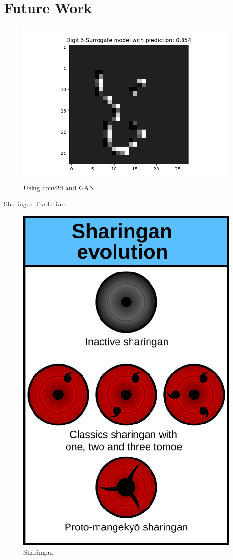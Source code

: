 \documentclass[12pt]{article}
\begin{document}
\section{Future Work}


\begin{figure}[H]
    \centering
    \includegraphics[width=0.7\linewidth]{../fig/ID 3-Digit 8 pred 5.png} %
    \caption{Using conv2d and GAN}
    \label{fig:digit5}
\end{figure}


Sharingan Evolution:\\

\begin{figure}[H]
    \centering
    \includegraphics[width=0.7\linewidth]{../fig/Sharingan-evo.png} %
    \caption{Sharingan}
    \label{fig:sharingan}
\end{figure}
\end{document}
